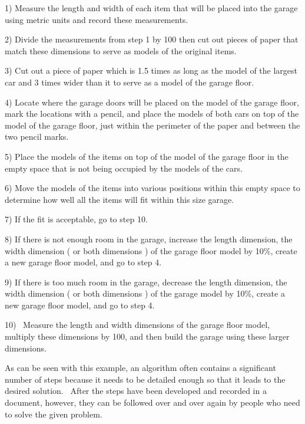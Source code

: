 \documentclass[12pt,twoside]{book}
\begin{document}
1) Measure the length and width of each item that will be placed into
the garage using metric units and record these measurements. 


\bigskip

2) Divide the measurements from step 1 by 100 then cut out pieces of
paper that match these dimensions to serve as models of the original
items.


\bigskip

3) Cut out a piece of paper which is 1.5 times as long as the model of
the largest car and 3 times wider than it to serve as a model of the
garage floor.


\bigskip

4) Locate where the garage doors will be placed on the model of the
garage floor, mark the locations with a pencil, and place the models of
both cars on top of the model of the garage floor, just within the
perimeter of the paper and between the two pencil marks.


\bigskip

5) Place the models of the items on top of the model of the garage floor
in the empty space that is not being occupied by the models of the
cars.


\bigskip

6) Move the models of the items into various positions within this empty
space to determine how well all the items will fit within this size
garage.


\bigskip

7) If the fit is acceptable, go to step 10.


\bigskip

8) If there is not enough room in the garage, increase the length
dimension, the width dimension ( or both dimensions ) of the garage
floor model by 10\%, create a new garage floor model, and go to step 4.



9) If there is too much room in the garage, decrease the length
dimension, the width dimension ( or both dimensions ) of the garage
model by 10\%, create a new garage floor model, and go to step 4.


\bigskip

10) \ Measure the length and width dimensions of the garage floor model,
multiply these dimensions by 100, and then build the garage using these
larger dimensions.


\bigskip

As can be seen with this example, an algorithm often contains a
significant number of steps because it needs to be detailed enough so
that it leads to the desired solution. \ After the steps have been
developed and recorded in a document, however, they can be followed
over and over again by people who need to solve the given problem.
\end{document}
